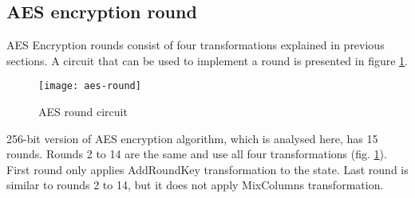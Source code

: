 \subsection{AES encryption round}

AES Encryption rounds consist of four transformations explained in previous sections. A circuit that can be used to implement a round is presented in figure \ref{fig:aes-round}.

\begin{figure}[!h]
\centering
\texttt{[image: aes-round]}
\caption{AES round circuit}
\label{fig:aes-round}
\end{figure}

256-bit version of AES encryption algorithm, which is analysed here, has 15 rounds. Rounds 2 to 14 are the same and use all four transformations (fig. \ref{fig:aes-round}). First round only applies AddRoundKey transformation to the state. Last round is similar to rounds 2 to 14, but it does not apply MixColumns transformation.

